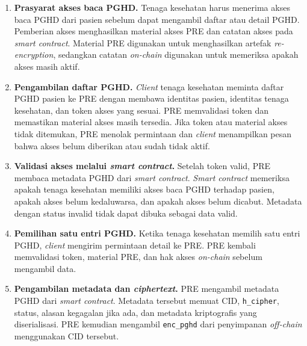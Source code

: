 \begin{enumerate}
	\item \textbf{Prasyarat akses baca PGHD.}
	      Tenaga kesehatan harus menerima akses baca PGHD dari pasien sebelum dapat mengambil daftar atau detail PGHD\@.
	      Pemberian akses menghasilkan material akses PRE dan catatan akses pada \textit{smart contract}.
	      Material PRE digunakan untuk menghasilkan artefak \textit{re-encryption}, sedangkan catatan \textit{on-chain} digunakan untuk memeriksa apakah akses masih aktif.

	\item \textbf{Pengambilan daftar PGHD.}
	      \textit{Client} tenaga kesehatan meminta daftar PGHD pasien ke PRE dengan membawa identitas pasien, identitas tenaga kesehatan, dan token akses yang sesuai.
	      PRE memvalidasi token dan memastikan material akses masih tersedia.
	      Jika token atau material akses tidak ditemukan, PRE menolak permintaan dan \textit{client} menampilkan pesan bahwa akses belum diberikan atau sudah tidak aktif.

	\item \textbf{Validasi akses melalui \textit{smart contract}.}
	      Setelah token valid, PRE membaca metadata PGHD dari \textit{smart contract}.
	      \textit{Smart contract} memeriksa apakah tenaga kesehatan memiliki akses baca PGHD terhadap pasien, apakah akses belum kedaluwarsa, dan apakah akses belum dicabut.
	      Metadata dengan status invalid tidak dapat dibuka sebagai data valid.


	\item \textbf{Pemilihan satu entri PGHD.}
	      Ketika tenaga kesehatan memilih satu entri PGHD, \textit{client} mengirim permintaan detail ke PRE\@.
	      PRE kembali memvalidasi token, material PRE, dan hak akses \textit{on-chain} sebelum mengambil data.

	\item \textbf{Pengambilan metadata dan \textit{ciphertext}.}
	      PRE mengambil metadata PGHD dari \textit{smart contract}. 
		  Metadata tersebut memuat CID, \texttt{h\_cipher}, status, alasan kegagalan jika ada, dan metadata kriptografis yang diserialisasi.
	      PRE kemudian mengambil \texttt{enc\_pghd} dari penyimpanan \textit{off-chain} menggunakan CID tersebut.


\end{enumerate}
